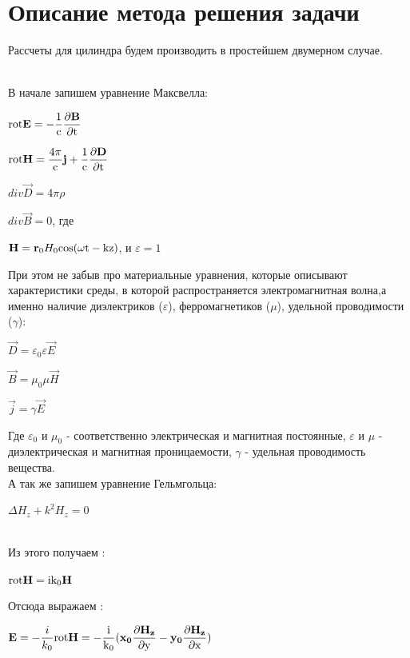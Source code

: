 \section{Описание метода решения задачи}
\begin{flushleft}
	Рассчеты для цилиндра будем производить в простейшем двумерном случае.
\end{flushleft}
\\
В начале запишем уравнение Максвелла: \\

\begin{center}
	$ 	\rm rot\vec{E} = -\dfrac{1}{c}\dfrac{\partial \vec{B}}{\partial t} $ 
\end{center}
\begin{center}
	$ 	\rm rot\vec{H} =\dfrac{4\pi}{c}\vec{j} + \dfrac{1}{c}\dfrac{\partial \vec{D}}{\partial t} $
\end{center}
\begin{center}
	$ 	div\vec{D} = 4\pi \rho $
\end{center}
	\begin{center}
		$ div \vec{B} = 0 $, где
	\end{center} 
\begin{center}
	$ \vec{H} = \vec{r}_{0}H_{0}\rm cos(\omega t - kz) $, и $ \varepsilon = 1 $ \\
\end{center}
При этом не забыв про материальные уравнения, которые описывают характеристики среды, в которой распространяется электромагнитная волна,а именно наличие диэлектриков ($ \varepsilon $), ферромагнетиков ($ \mu $), удельной проводимости ($ \gamma $):
\begin{center}
	$ \vec{D} = \varepsilon_{0} \varepsilon \vec{E} $
\end{center}
\begin{center}
	$ \vec{B} = \mu_{0} \mu \vec{H} $
\end{center}
\begin{center}
	$ \vec{j} = \gamma \vec{E} $
\end{center}
Где $ \varepsilon_{0} $ и $ \mu_{0} $ - соответственно электрическая и магнитная постоянные, $ \varepsilon $ и $ \mu $ - диэлектрическая и магнитная проницаемости, $ \gamma $ - удельная проводимость вещества. \\
А так же запишем уравнение Гельмгольца:
\begin{center}
	$ \Delta H_{z} + k^2H_{z} = 0 $ 
\end{center}\\
Из этого получаем : \begin{center}
	$ \rm rot\vec{H} = ik_{0}\vec{H} $
\end{center}
Отсюда выражаем  : \\
\begin{center}
	$\vec{E} = - \dfrac{i}{k_{0}} \rm rot\vec{H} = - \dfrac{i}{k_{0}}(\vec{x_{0}}\dfrac{\partial \vec{H_{z}}}{\partial y} - \vec{y_{0}}\dfrac{\partial \vec{H_{z}}}{\partial x}) 
	$
\end{center}

